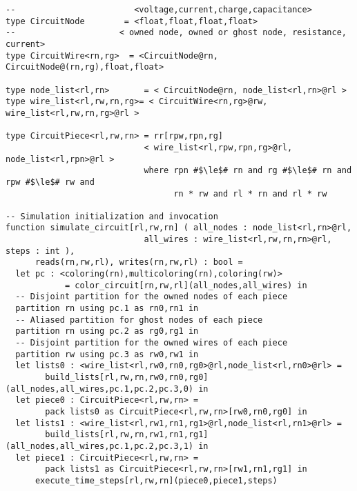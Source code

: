 \begin{lstlisting}[float={t},label={lst:circuit_ex},caption={Circuit Simulation}]
--                        <voltage,current,charge,capacitance>
type CircuitNode        = <float,float,float,float>
--                     < owned node, owned or ghost node, resistance, current>
type CircuitWire<rn,rg>  = <CircuitNode@rn, CircuitNode@(rn,rg),float,float>

type node_list<rl,rn>       = < CircuitNode@rn, node_list<rl,rn>@rl >
type wire_list<rl,rw,rn,rg>= < CircuitWire<rn,rg>@rw, wire_list<rl,rw,rn,rg>@rl >

type CircuitPiece<rl,rw,rn> = rr[rpw,rpn,rg]
                            < wire_list<rl,rpw,rpn,rg>@rl, node_list<rl,rpn>@rl >         
                            where rpn #$\le$# rn and rg #$\le$# rn and rpw #$\le$# rw and
                                  rn * rw and rl * rn and rl * rw

-- Simulation initialization and invocation
function simulate_circuit[rl,rw,rn] ( all_nodes : node_list<rl,rn>@rl, 
                            all_wires : wire_list<rl,rw,rn,rn>@rl, steps : int ), 
      reads(rn,rw,rl), writes(rn,rw,rl) : bool = 
  let pc : <coloring(rn),multicoloring(rn),coloring(rw)> 
            = color_circuit[rn,rw,rl](all_nodes,all_wires) in
  -- Disjoint partition for the owned nodes of each piece
  partition rn using pc.1 as rn0,rn1 in
  -- Aliased partition for ghost nodes of each piece
  partition rn using pc.2 as rg0,rg1 in
  -- Disjoint partition for the owned wires of each piece
  partition rw using pc.3 as rw0,rw1 in
  let lists0 : <wire_list<rl,rw0,rn0,rg0>@rl,node_list<rl,rn0>@rl> = 
        build_lists[rl,rw,rn,rw0,rn0,rg0](all_nodes,all_wires,pc.1,pc.2,pc.3,0) in
  let piece0 : CircuitPiece<rl,rw,rn> = 
        pack lists0 as CircuitPiece<rl,rw,rn>[rw0,rn0,rg0] in
  let lists1 : <wire_list<rl,rw1,rn1,rg1>@rl,node_list<rl,rn1>@rl> =
        build_lists[rl,rw,rn,rw1,rn1,rg1](all_nodes,all_wires,pc.1,pc.2,pc.3,1) in
  let piece1 : CircuitPiece<rl,rw,rn> = 
        pack lists1 as CircuitPiece<rl,rw,rn>[rw1,rn1,rg1] in
      execute_time_steps[rl,rw,rn](piece0,piece1,steps)


\end{lstlisting}
